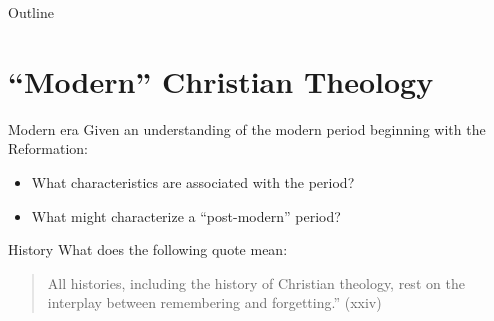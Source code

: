 

\maketitle
\begin{frame}{Outline}
\setcounter{tocdepth}{1}
\tableofcontents
\end{frame}

\section{``Modern'' Christian Theology}
\label{sec-1}
    {
    \begin{frame}[plain]
    \end{frame}
    }


\begin{frame}[label=sec-1-2]{Modern era}
Given an understanding of the modern period beginning with the Reformation:
\begin{itemize}[<+->]
\item What characteristics are associated with the period?
\item What might characterize a ``post-modern'' period?
\end{itemize}
\end{frame}

\begin{frame}[label=sec-1-3]{History}
What does the following quote mean:

\begin{quote}
All histories, including the history of Christian theology, rest on the interplay between remembering and forgetting.'' (xxiv)
\end{quote}
\end{frame}

